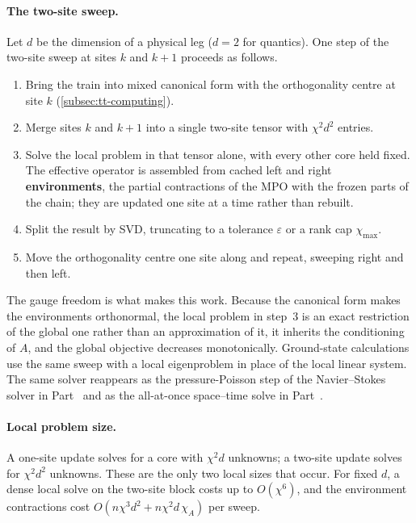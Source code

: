 \paragraph{The two-site sweep.}
Let $d$ be the dimension of a physical leg ($d = 2$ for quantics). One step of
the two-site sweep at sites $k$ and $k+1$ proceeds as follows.
\begin{enumerate}
  \item Bring the train into mixed canonical form with the orthogonality centre
    at site $k$ (\cref{subsec:tt-computing}).
  \item Merge sites $k$ and $k+1$ into a single two-site tensor with
    $\chi^2 d^2$ entries.
  \item Solve the local problem in that tensor alone, with every other core held
    fixed. The effective operator is assembled from cached left and right
    \textbf{environments}, the partial contractions of the MPO with the frozen
    parts of the chain; they are updated one site at a time rather than rebuilt.
  \item Split the result by SVD, truncating to a tolerance $\varepsilon$ or a
    rank cap $\chi_{\max}$.
  \item Move the orthogonality centre one site along and repeat, sweeping right
    and then left.
\end{enumerate}
The gauge freedom is what makes this work. Because the canonical form makes the
environments orthonormal, the local problem in step~3 is an exact restriction of
the global one rather than an approximation of it, it inherits the conditioning
of $A$, and the global objective decreases monotonically. Ground-state
calculations use the same sweep with a local eigenproblem in place of the local
linear system. The same solver reappears as the pressure-Poisson step of the
Navier--Stokes solver in Part~ and as the all-at-once space--time
solve in Part~.

\paragraph{Local problem size.}
A one-site update solves for a core with $\chi^2 d$ unknowns; a two-site update
solves for $\chi^2 d^2$ unknowns. These are the only two local sizes that occur.
For fixed $d$, a dense local solve on the two-site block costs up to
$O(\chi^6)$, and the environment contractions cost
$O(n \chi^3 d^2 + n \chi^2 d\, \chi_A)$ per sweep.

